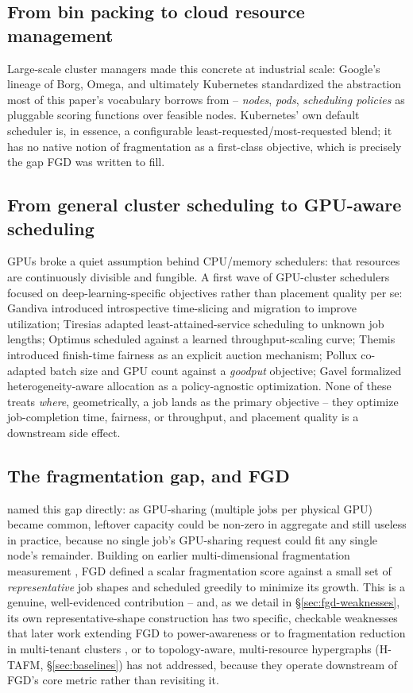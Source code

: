 \documentclass[11pt]{article}
\begin{document}
\subsection{From bin packing to cloud resource management}
Large-scale cluster managers made this concrete at industrial scale:
Google's lineage of Borg, Omega, and ultimately Kubernetes
\citep{borg2016} standardized the abstraction most of this paper's
vocabulary borrows from -- \emph{nodes}, \emph{pods}, \emph{scheduling
policies} as pluggable scoring functions over feasible nodes.
Kubernetes' own default scheduler is, in essence, a configurable
least-requested/most-requested blend; it has no native notion of
fragmentation as a first-class objective, which is precisely the gap FGD
was written to fill.

\subsection{From general cluster scheduling to GPU-aware scheduling}
GPUs broke a quiet assumption behind CPU/memory schedulers: that resources
are continuously divisible and fungible. A first wave of GPU-cluster
schedulers focused on deep-learning-specific objectives rather than
placement quality per se: Gandiva \citep{gandiva2018} introduced
introspective time-slicing and migration to improve utilization; Tiresias
\citep{tiresias2019} adapted least-attained-service scheduling to unknown
job lengths; Optimus \citep{optimus2018} scheduled against a learned
throughput-scaling curve; Themis \citep{themis2020} introduced
finish-time fairness as an explicit auction mechanism; Pollux
\citep{pollux2021} co-adapted batch size and GPU count against a
\emph{goodput} objective; Gavel \citep{gavel2020} formalized
heterogeneity-aware allocation as a policy-agnostic optimization. None of
these treats \emph{where}, geometrically, a job lands as the primary
objective -- they optimize job-completion time, fairness, or throughput,
and placement quality is a downstream side effect.

\subsection{The fragmentation gap, and FGD}
\citet{fgd2023} named this gap directly: as GPU-sharing (multiple jobs per
physical GPU) became common, leftover capacity could be non-zero in
aggregate and still useless in practice, because no single job's
GPU-sharing request could fit any single node's remainder. Building on
earlier multi-dimensional fragmentation measurement \citep{defrag2015},
FGD defined a scalar fragmentation score against a small set of
\emph{representative} job shapes and scheduled greedily to minimize its
growth. This is a genuine, well-evidenced contribution -- and, as we
detail in \S\ref{sec:fgd-weaknesses}, its own representative-shape
construction has two specific, checkable weaknesses that later work
extending FGD to power-awareness \citep{pwr2024} or to fragmentation
reduction in multi-tenant clusters \citep{cafgd2025}, or to topology-aware,
multi-resource hypergraphs (H-TAFM, \S\ref{sec:baselines}) has not
addressed, because they operate downstream of FGD's core metric rather
than revisiting it.
\end{document}
